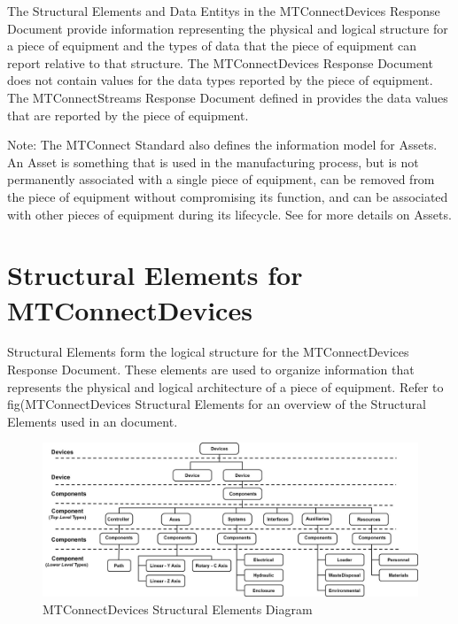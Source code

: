 The \glspl{Structural Element} and \glspl{Data Entity} in the \gls{MTConnectDevices Response Document} provide information representing the physical and logical structure for a piece of equipment and the types of data that the piece of equipment can report relative to that structure.   The \gls{MTConnectDevices Response Document} does not contain values for the data types reported by the piece of equipment.  The \gls{MTConnectStreams Response Document} defined in  provides the data values that are reported by the piece of equipment.

\begin{note}
Note:  The \gls{MTConnect Standard} also defines the information model for \glspl{Asset}.  An \gls{Asset} is something that is used in the manufacturing process, but is not permanently associated with a single piece of equipment, can be removed from the piece of equipment without compromising its function, and can be associated with other pieces of equipment during its lifecycle.  See  for more details on \glspl{Asset}.

\end{note}

\section{Structural Elements for MTConnectDevices}
\label{sec:Structural Elements for MTConnectDevices}

\glspl{Structural Element} form the logical structure for the \gls{MTConnectDevices Response Document}.  These elements are used to organize information that represents the physical and logical architecture of a piece of equipment.  Refer to {{fig(MTConnectDevices Structural Elements}} for an overview of the \glspl{Structural Element} used in an  document.

\begin{figure}[ht]
  \centering
    \includegraphics[width=1.0\textwidth]{figures/MTConnectDevices Structural Elements.png}
  \caption{MTConnectDevices Structural Elements Diagram}
  \label{fig:MTConnectDevices Structural Elements Diagram}
\end{figure}

